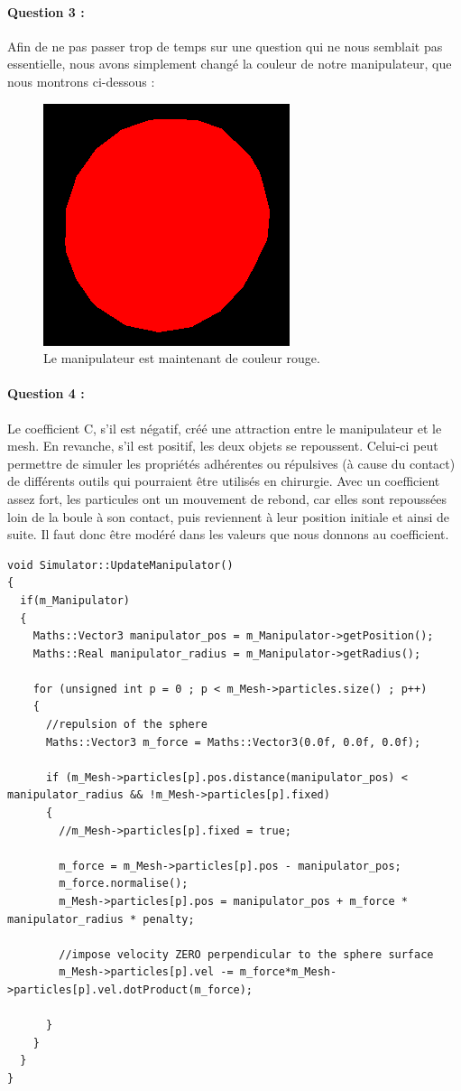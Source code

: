 \documentclass[a4paper,12pt]{article}
\begin{document}
\paragraph{Question 3 :} Afin de ne pas passer trop de temps sur une question qui ne nous semblait pas essentielle, nous avons simplement changé la couleur de notre manipulateur, que nous montrons ci-dessous :
\begin{figure}[ht!]
  \centering
  \includegraphics{images/manipulateur.png}
  \caption{Le manipulateur est maintenant de couleur rouge.}
  \label{fig:custom}
\end{figure}


\newpage\paragraph{Question 4 :} Le coefficient C, s'il est négatif, créé une attraction entre le manipulateur et le mesh. En revanche, s'il est positif, les deux objets se repoussent. Celui-ci peut permettre de simuler les propriétés adhérentes ou répulsives (à cause du contact) de différents outils qui pourraient être utilisés en chirurgie. Avec un coefficient assez fort, les particules ont un mouvement de rebond, car elles sont repoussées loin de la boule à son contact, puis reviennent à leur position initiale et ainsi de suite. Il faut donc être modéré dans les valeurs que nous donnons au coefficient.
\begin{lstlisting}
void Simulator::UpdateManipulator()
{
  if(m_Manipulator)
  {
    Maths::Vector3 manipulator_pos = m_Manipulator->getPosition();
    Maths::Real manipulator_radius = m_Manipulator->getRadius();

    for (unsigned int p = 0 ; p < m_Mesh->particles.size() ; p++) 
    {
      //repulsion of the sphere
      Maths::Vector3 m_force = Maths::Vector3(0.0f, 0.0f, 0.0f);

      if (m_Mesh->particles[p].pos.distance(manipulator_pos) < manipulator_radius && !m_Mesh->particles[p].fixed)
      {
        //m_Mesh->particles[p].fixed = true;
        
        m_force = m_Mesh->particles[p].pos - manipulator_pos;
        m_force.normalise();  
        m_Mesh->particles[p].pos = manipulator_pos + m_force * manipulator_radius * penalty;    

        //impose velocity ZERO perpendicular to the sphere surface
        m_Mesh->particles[p].vel -= m_force*m_Mesh->particles[p].vel.dotProduct(m_force);

      }
    }
  }
}
\end{lstlisting}
\end{document}
